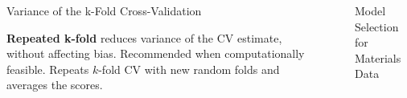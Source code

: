 \documentclass[final]{beamer}
\newlength{\sepwid}
\newlength{\onecolwid}
\begin{document}
\begin{frame}[t]
\begin{columns}[t]
\begin{column}{\onecolwid}
\begin{block}{Variance of the k-Fold Cross-Validation}
\vspace{0.5em}

\textbf{Repeated k-fold} reduces variance of the CV estimate, without affecting bias. 
Recommended when computationally feasible. 
Repeats $k$-fold CV with new random folds and averages the scores.
\end{block}






\end{column} %

\begin{column}{\sepwid}\end{column} %

\begin{column}{\onecolwid} %


\begin{block}{Model Selection for Materials Data}


\end{block}
\end{column}
\end{columns}
\end{frame}
\end{document}
